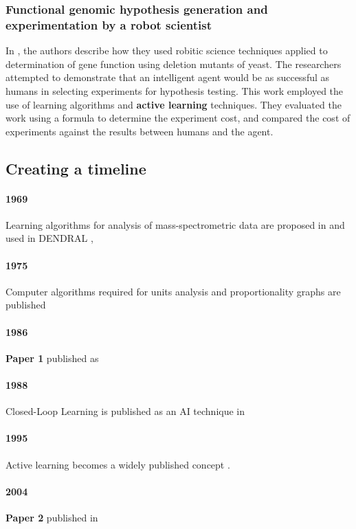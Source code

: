 \subsubsection{Functional genomic hypothesis generation and experimentation by a robot scientist}
In \cite{king_functional_2004}, the authors describe how they used robitic science techniques applied to determination of gene function using deletion mutants of yeast. The researchers attempted to demonstrate that an intelligent agent would be as successful as humans in selecting experiments for hypothesis testing. This work employed the use of learning algorithms \cite{lederberg_applications_1969} and \textbf{active learning} techniques. They evaluated the work using a formula to determine the experiment cost, and compared the cost of experiments against the results between humans and the agent.

\subsection{Creating a timeline}
\paragraph{1969} Learning algorithms for analysis of mass-spectrometric data are proposed in \cite{lederberg_applications_1969} and used in DENDRAL \cite{feigenbaum_artificial_1968}, \cite{lindsay_dendral_1993}
\paragraph{1975} Computer algorithms required for units analysis and proportionality graphs are published
\paragraph{1986} \textbf{Paper 1} published as \cite{falkenhainer_integrating_1986}
\paragraph{1988} Closed-Loop Learning is published as an AI technique in \cite{watanabe_constructive_1988}
\paragraph{1995} Active learning becomes a widely published concept \cite{cohn_active_1995}.
\paragraph{2004} \textbf{Paper 2} published in \cite{king_functional_2004}
